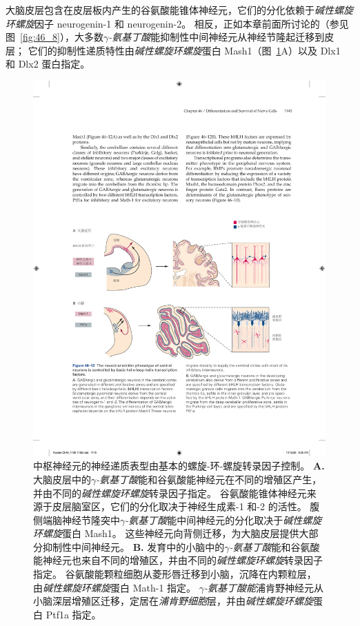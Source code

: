 大脑皮层包含在皮层板内产生的谷氨酸能锥体神经元，它们的分化依赖于\textit{碱性螺旋环螺旋}因子 neurogenin-1 和 neurogenin-2。
相反，正如本章前面所讨论的（参见图~\ref{fig:46_8}），大多数\textit{$\gamma$-氨基丁酸}能抑制性中间神经元从神经节隆起迁移到皮层；
它们的抑制性递质特性由\textit{碱性螺旋环螺旋}蛋白 Mash1（图~\ref{fig:46_12}A）以及 Dlx1 和 Dlx2 蛋白指定。


\begin{figure}[htbp]
	\centering
	\includegraphics[width=1.0\linewidth]{chap46/fig_46_12}
	\caption{中枢神经元的神经递质表型由基本的螺旋-环-螺旋转录因子控制。
		\textbf{A.} 大脑皮层中的\textit{$\gamma$-氨基丁酸}能和谷氨酸能神经元在不同的增殖区产生，并由不同的\textit{碱性螺旋环螺旋}转录因子指定。
		谷氨酸能锥体神经元来源于皮层脑室区，它们的分化取决于神经生成素-1 和-2 的活性。
		腹侧端脑神经节隆突中\textit{$\gamma$-氨基丁酸}能中间神经元的分化取决于\textit{碱性螺旋环螺旋}蛋白 Mash1。
		这些神经元向背侧迁移，为大脑皮层提供大部分抑制性中间神经元。
		\textbf{B.} 发育中的小脑中的\textit{$\gamma$-氨基丁酸}能和谷氨酸能神经元也来自不同的增殖区，并由不同的\textit{碱性螺旋环螺旋}转录因子指定。
		谷氨酸能颗粒细胞从菱形唇迁移到小脑，沉降在内颗粒层，由\textit{碱性螺旋环螺旋}蛋白 Math-1 指定。
		\textit{$\gamma$-氨基丁酸能}浦肯野神经元从小脑深层增殖区迁移，定居在\textit{浦肯野细胞}层，并由\textit{碱性螺旋环螺旋}蛋白 Ptf1a 指定。}
	\label{fig:46_12}
\end{figure}


